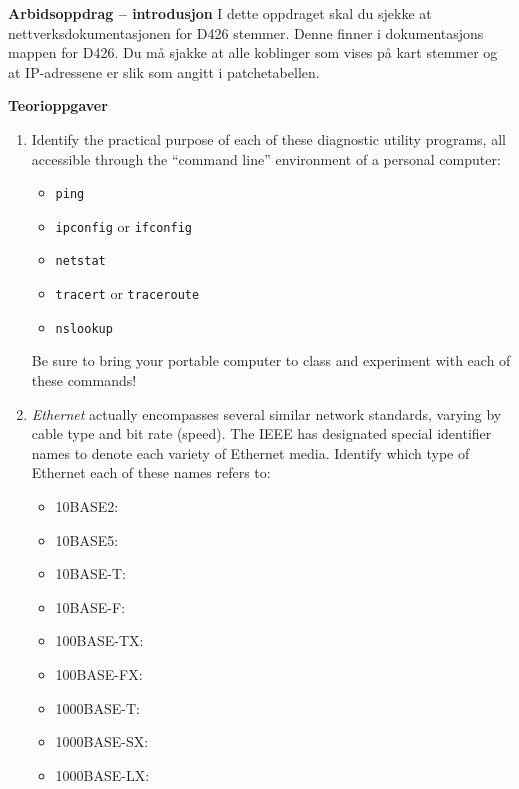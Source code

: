

\noindent

\vskip 5pt


\textbf{Arbidsoppdrag -- introdusjon}
 I dette oppdraget skal du sjekke at nettverksdokumentasjonen for D426 stemmer. Denne finner i dokumentasjons mappen for D426. 
Du  må sjakke at alle koblinger som vises på kart stemmer og at IP-adressene er slik som  angitt i patchetabellen. 

\textbf{Teorioppgaver}
\begin{enumerate}



\item Identify the practical purpose of each of these diagnostic utility programs, all accessible through the ``command line'' environment of a personal computer:

\begin{itemize}
\item{} {\tt ping}
\vskip 10pt
\item{} {\tt ipconfig} or {\tt ifconfig}
\vskip 10pt
\item{} {\tt netstat}
\vskip 10pt
\item{} {\tt tracert} or {\tt traceroute}
\vskip 10pt
\item{} {\tt nslookup}
\end{itemize}

Be sure to bring your portable computer to class and experiment with each of these commands!


\item {\it Ethernet} actually encompasses several similar network standards, varying by cable type and bit rate (speed).  The IEEE has designated special identifier names to denote each variety of Ethernet media.  Identify which type of Ethernet each of these names refers to:

\begin{itemize}
\item{} 10BASE2:
\vskip 5pt
\item{} 10BASE5:
\vskip 5pt
\item{} 10BASE-T:
\vskip 5pt
\item{} 10BASE-F:
\vskip 5pt
\item{} 100BASE-TX:
\vskip 5pt
\item{} 100BASE-FX:
\vskip 5pt
\item{} 1000BASE-T:
\vskip 5pt
\item{} 1000BASE-SX:
\vskip 5pt
\item{} 1000BASE-LX:
\end{itemize}


\end{enumerate}

